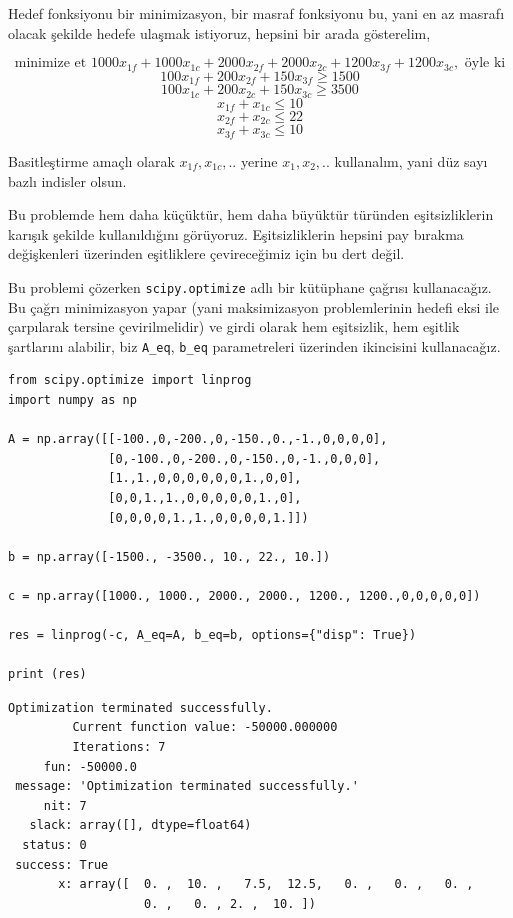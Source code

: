 \documentclass[12pt,fleqn]{article}\usepackage{../../common}
\begin{document}
Hedef fonksiyonu bir minimizasyon, bir masraf fonksiyonu bu, yani en az masrafı
olacak şekilde hedefe ulaşmak istiyoruz, hepsini bir arada gösterelim,

$$ \textrm{minimize et  }
1000 x_{1f} + 1000 x_{1c} + 2000 x_{2f} + 2000 x_{2c} + 1200 x_{3f} + 1200 x_{3c},
\textrm{ öyle ki} $$ 
$$ 100 x_{1f} + 200 x_{2f} + 150 x_{3f} \ge 1500$$
$$ 100 x_{1c} + 200 x_{2c} + 150 x_{3c} \ge 3500 $$
$$ x_{1f} + x_{1c} \le 10 $$
$$ x_{2f} + x_{2c} \le 22 $$
$$ x_{3f} + x_{3c} \le 10 $$

Basitleştirme amaçlı olarak $x_{1f},x_{1c},..$ yerine $x_1,x_2,..$ kullanalım,
yani düz sayı bazlı indisler olsun.

Bu problemde hem daha küçüktür, hem daha büyüktür türünden eşitsizliklerin
karışık şekilde kullanıldığını görüyoruz. Eşitsizliklerin hepsini pay bırakma
değişkenleri üzerinden eşitliklere çevireceğimiz için bu dert değil.

Bu problemi çözerken \verb!scipy.optimize! adlı bir kütüphane çağrısı
kullanacağız. Bu çağrı minimizasyon yapar (yani maksimizasyon problemlerinin
hedefi eksi ile çarpılarak tersine çevirilmelidir) ve girdi olarak hem
eşitsizlik, hem eşitlik şartlarını alabilir, biz \verb!A_eq!, \verb!b_eq!
parametreleri üzerinden ikincisini kullanacağız.

\begin{verbatim}
from scipy.optimize import linprog
import numpy as np

A = np.array([[-100.,0,-200.,0,-150.,0.,-1.,0,0,0,0],
              [0,-100.,0,-200.,0,-150.,0,-1.,0,0,0],
              [1.,1.,0,0,0,0,0,0,1.,0,0],
              [0,0,1.,1.,0,0,0,0,0,1.,0],
              [0,0,0,0,1.,1.,0,0,0,0,1.]])

b = np.array([-1500., -3500., 10., 22., 10.])

c = np.array([1000., 1000., 2000., 2000., 1200., 1200.,0,0,0,0,0])

res = linprog(-c, A_eq=A, b_eq=b, options={"disp": True})

print (res)
\end{verbatim}

\begin{verbatim}
Optimization terminated successfully.
         Current function value: -50000.000000
         Iterations: 7
     fun: -50000.0
 message: 'Optimization terminated successfully.'
     nit: 7
   slack: array([], dtype=float64)
  status: 0
 success: True
       x: array([  0. ,  10. ,   7.5,  12.5,   0. ,   0. ,   0. ,
                   0. ,   0. , 2. ,  10. ])
\end{verbatim}
\end{document}
